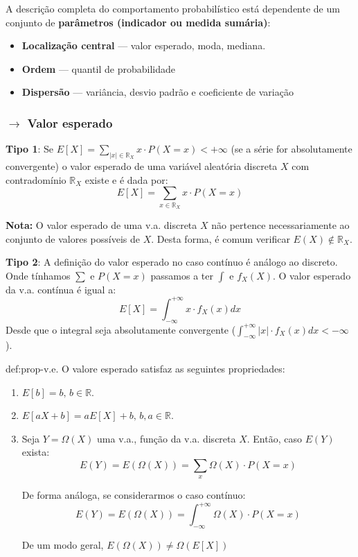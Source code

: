 A descrição completa do comportamento probabilístico está dependente de um conjunto de \textbf{parâmetros (indicador ou medida sumária)}:

\begin{itemize}
    \item \textbf{Localização central} --- valor esperado, moda, mediana.
    \item \textbf{Ordem} --- quantil de probabilidade
    \item \textbf{Dispersão} --- variância, desvio padrão e coeficiente de variação
\end{itemize}

\subsubsection[2.2.1 Valor esperado]{$\pmb{\rightarrow}$ Valor esperado}

\noindent \textbf{Tipo 1}: Se $E[X] = \sum_{|x| \in \mathbb{R}_X} x \cdot P(X = x) < +\infty$ (se a série for absolutamente convergente) o valor esperado de uma variável aleatória discreta $X$ com contradomínio $\mathbb{R}_X$ existe e é dada por:
$$
    \boxed{E[X] = \sum_{x \in \mathbb{R}_X} x \cdot P(X = x)}
$$

\noindent\textbf{Nota:} O valor esperado de uma v.a. discreta $X$ não pertence necessariamente ao conjunto de valores possíveis de $X$. Desta forma, é comum verificar $E(X) \notin \mathbb{R}_X$.

\vspace{1 em}
\noindent \textbf{Tipo 2}: A definição do valor esperado no caso contínuo é análogo ao discreto. Onde tínhamos $\sum$ e $P(X = x)$ passamos a ter $\int$ e $f_X(X)$. O valor esperado da v.a. contínua é igual a:
$$
    E[X] = \int_{-\infty}^{+\infty} x \cdot f_X(x) dx
$$
\noindent Desde que o integral seja absolutamente convergente ($\int_{-\infty}^{+\infty} |x| \cdot f_X(x) dx < -\infty$).

\begin{theo}{def:prop-v.e.}\label{def:prop-v.e.}
\noindent O valore esperado satisfaz as seguintes propriedades:

\begin{enumerate} 
    \item $E[b] = b,\, b\in \mathbb{R}$.
    \item $E[aX + b] = aE[X] + b,\, b,a\in \mathbb{R}$.
    \item Seja $Y = \Omega(X)$ uma v.a., função da v.a. discreta $X$. Então, caso $E(Y)$ exista:
    $$
        E(Y) = E(\Omega(X)) = \sum_x \Omega(X) \cdot P(X = x)
    $$

    De forma análoga, se considerarmos o caso contínuo:
    $$
        E(Y) = E(\Omega(X)) = \int_{-\infty}^{+\infty} \Omega(X) \cdot P(X = x)
    $$

    De um modo geral, $E(\Omega(X)) \ne \Omega(E[X])$
\end{enumerate}
\end{theo}

